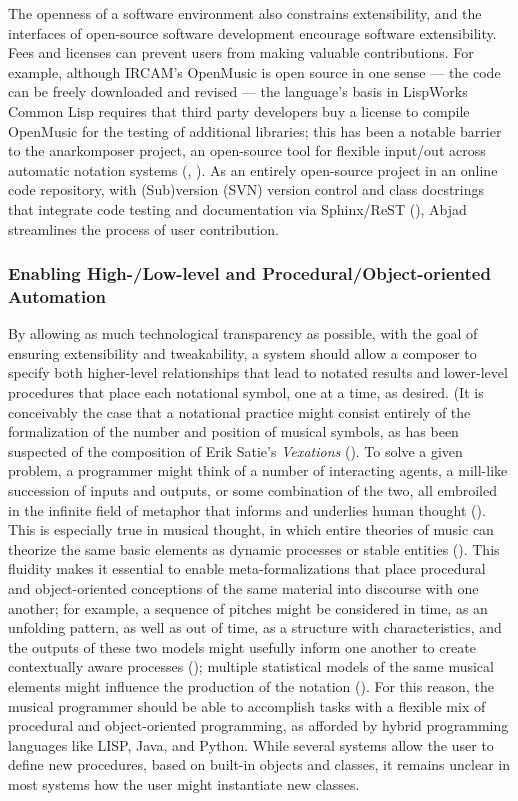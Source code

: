 The openness of a software environment also constrains extensibility, and the interfaces of open-source software development encourage software extensibility. Fees and licenses can prevent users from making valuable contributions. For example, although IRCAM's OpenMusic is open source in one sense --- the code can be freely downloaded and revised --- the language's basis in LispWorks Common Lisp requires that third party developers buy a license to compile OpenMusic for the testing of additional libraries; this has been a notable barrier to the anarkomposer project, an open-source tool for flexible input/out across automatic notation systems (\cite{Echevarria:2013yj}, \cite{:km}). As an entirely open-source project in an online code repository, with (Sub)version (SVN) version control and class docstrings that integrate code testing and documentation via Sphinx/ReST (\cite{:sphinxReST}), Abjad streamlines the process of user contribution. 

\subsubsection{Enabling High-/Low-level and Procedural/Object-oriented Automation}
By allowing as much technological transparency as possible, with the goal of ensuring extensibility and tweakability, a system should allow a composer to specify both higher-level relationships that lead to notated results and lower-level procedures that place each notational symbol, one at a time, as desired. (It is conceivably the case that a notational practice might consist entirely of the formalization of the number and position of musical symbols, as has been suspected of the composition of Erik Satie's \emph{Vexations} (\cite{Orledge1998}). To solve a given problem, a programmer might think of a number of interacting agents, a mill-like succession of inputs and outputs, or some combination of the two, all embroiled in the infinite field of metaphor that informs and underlies human thought (\cite{Lakoff1980}). This is especially true in musical thought, in which entire theories of music can theorize the same basic elements as dynamic processes or stable entities (\cite{Berger:1994bs}). This fluidity makes it essential to enable meta-formalizations that place procedural and object-oriented conceptions of the same material into discourse with one another; for example, a sequence of pitches might be considered in time, as an unfolding pattern, as well as out of time, as a structure with characteristics, and the outputs of these two models might usefully inform one another to create contextually aware processes (\cite{Hedelin2008}); multiple statistical models of the same musical elements might influence the production of the notation (\cite{Pearce2005}). For this reason, the musical programmer should be able to accomplish tasks with a flexible mix of procedural and object-oriented programming, as afforded by hybrid programming languages like LISP, Java, and Python. While several systems allow the user to define new procedures, based on built-in objects and classes, it remains unclear in most systems how the user might instantiate new classes. 

